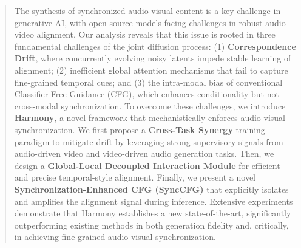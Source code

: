 \begin{abstract}

The synthesis of synchronized audio-visual content is a key challenge in generative AI, with open-source models facing challenges in robust audio-video alignment. 
Our analysis reveals that this issue is rooted in three fundamental challenges of the joint diffusion process: (1) \textbf{Correspondence Drift}, where concurrently evolving noisy latents impede stable learning of alignment; (2) inefficient global attention mechanisms that fail to capture fine-grained temporal cues; and (3) the intra-modal bias of conventional Classifier-Free Guidance (CFG), which enhances conditionality but not cross-modal synchronization.
To overcome these challenges, we introduce \textbf{Harmony}, a novel framework that mechanistically enforces audio-visual synchronization. We first propose a \textbf{Cross-Task Synergy} training paradigm to mitigate drift by leveraging strong supervisory signals from audio-driven video and video-driven audio generation tasks. Then, we design a \textbf{Global-Local Decoupled Interaction Module} for efficient and precise temporal-style alignment. Finally, we present a novel \textbf{Synchronization-Enhanced CFG (SyncCFG)} that explicitly isolates and amplifies the alignment signal during inference. Extensive experiments demonstrate that Harmony establishes a new state-of-the-art, significantly outperforming existing methods in both generation fidelity and, critically, in achieving fine-grained audio-visual synchronization.

\end{abstract}
